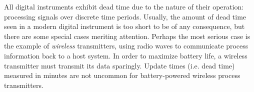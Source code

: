\vskip 10pt

All digital instruments exhibit dead time due to the nature of their operation: processing signals over discrete time periods.  Usually, the amount of dead time seen in a modern digital instrument is too short to be of any consequence, but there are some special cases meriting attention.  Perhaps the most serious case is the example of \textit{wireless} transmitters, using radio waves to communicate process information back to a host system.  In order to maximize battery life, a wireless transmitter must transmit its data sparingly.  Update times (i.e. dead time) measured in minutes are not uncommon for battery-powered wireless process transmitters.  





















